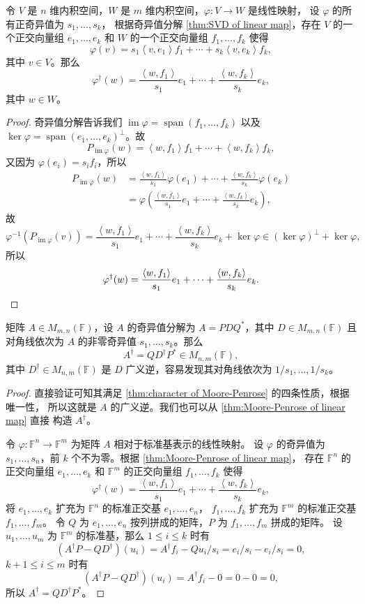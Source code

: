 \documentclass[fontset=none,zihao=-4]{Notes}
\DeclareMathOperator\im{im}
\newcommand{\inn}[1]{\left\langle#1\right\rangle}
\newcommand{\spa}[1]{\operatorname{span}\left(#1\right)}
\begin{document}
\begin{theorem}\label{thm:Moore-Penrose of linear map}
  令 $V$ 是 $n$ 维内积空间，$W$ 是 $m$ 维内积空间，$\varphi:V\to W$ 是线性映射，
  设 $\varphi$ 的所有正奇异值为 $s_1,\dots,s_k$，
  根据奇异值分解 \ref{thm:SVD of linear map}，存在 $V$ 的一个正交向量组 $e_1,\dots,e_k$ 和 $W$ 的一个正交向量组
  $f_1,\dots,f_k$ 使得
  \[
    \varphi(v)=s_1\inn{v,e_1}f_1+\cdots+s_k\inn{v,e_k}f_k,  
  \]
  其中 $v\in V$。那么
  \[
    \varphi^\dagger(w)=\frac{\inn{w,f_1}}{s_1}e_1+\cdots+\frac{\inn{w,f_k}}{s_k}e_k,  
  \]
  其中 $w\in W$。
\end{theorem}
\begin{proof}
  奇异值分解告诉我们 $\im\varphi=\spa{f_1,\dots,f_k}$ 以及
  $\ker\varphi=\spa{e_1,\dots,e_k}^\bot$。故
  \[
    P_{\im\varphi}(w)=\inn{w,f_1}f_1+\cdots+\inn{w,f_k}f_k,  
  \]
  又因为 $\varphi(e_i)=s_if_i$，所以
  \begin{align*}
    P_{\im\varphi}(w)&=\frac{\inn{w,f_1}}{s_1}\varphi(e_1)+\cdots+\frac{\inn{w,f_k}}{s_k}\varphi(e_k)\\
    &=\varphi\left(\frac{\inn{w,f_1}}{s_1}e_1+\cdots+\frac{\inn{w,f_k}}{s_k}e_k\right),
  \end{align*}
  故
  \[
    \varphi^{-1}(P_{\im\varphi}(v))=\frac{\inn{w,f_1}}{s_1}e_1+\cdots+\frac{\inn{w,f_k}}{s_k}e_k+\ker\varphi
    \in (\ker\varphi)^\bot+\ker\varphi,
  \]
  所以
  \[
    \varphi^\dagger(w)=\frac{\inn{w,f_1}}{s_1}e_1+\cdots+\frac{\inn{w,f_k}}{s_k}e_k.
    \qedhere
  \]
\end{proof}

\begin{theorem}[矩阵的广义逆]
  矩阵 $A\in M_{m,n}(\mathbb{F})$，设 $A$ 的奇异值分解为
  $A=PDQ^*$，其中 $D\in M_{m,n}(\mathbb{F})$ 且对角线依次为 $A$ 的非零奇异值 $s_1,\dots,s_k$。那么
  \[
    A^\dagger=QD^\dagger P^*\in M_{n,m}(\mathbb{F}),  
  \] 
  其中 $D^\dagger\in M_{n,m}(\mathbb{F})$ 是 $D$ 广义逆，容易发现其对角线依次为 $1/s_1,\dots,1/s_k$。
\end{theorem}
\begin{proof}
  直接验证可知其满足 \autoref{thm:character of Moore-Penrose} 的四条性质，根据唯一性，
  所以这就是 $A$ 的广义逆。我们也可以从 \autoref{thm:Moore-Penrose of linear map} 直接
  构造 $A^\dagger$。

  令 $\varphi:\mathbb{F}^n\to\mathbb{F}^m$ 为矩阵 $A$ 相对于标准基表示的线性映射。
  设 $\varphi$ 的奇异值为 $s_1,\dots,s_n$，前 $k$ 个不为零。根据 \autoref{thm:Moore-Penrose of linear map}，
  存在 $\mathbb{F}^n$ 的正交向量组 $e_1,\dots,e_k$ 和 $\mathbb{F}^m$ 的正交向量组
  $f_1,\dots,f_k$ 使得
  \[
    \varphi^\dagger(w)=\frac{\inn{w,f_1}}{s_1}e_1+\cdots+\frac{\inn{w,f_k}}{s_k}e_k,  
  \]
  将 $e_1,\dots,e_k$ 扩充为 $\mathbb{F}^n$ 的标准正交基 $e_1,\dots,e_n$，
   $f_1,\dots,f_k$ 扩充为 $\mathbb{F}^m$ 的标准正交基 $f_1,\dots,f_m$。
  令 $Q$ 为 $e_1,\dots,e_n$ 按列拼成的矩阵，$P$ 为 $f_1,\dots,f_m$ 拼成的矩阵。
  设 $u_1,\dots,u_m$ 为 $\mathbb{F}^m$ 的标准基，那么
  $1\leq i\leq k$ 时有
  \[
    (A^\dagger P-QD^\dagger)(u_i)=A^\dagger f_i-Qu_i/s_i=e_i/s_i-e_i/s_i=0,
  \]
  $k+1\leq i\leq m$ 时有
  \[
    (A^\dagger P-QD^\dagger)(u_i)=A^\dagger f_i-0=0-0=0,
  \]
  所以 $A^\dagger=QD^\dagger P^*$。
\end{proof}
\end{document}
